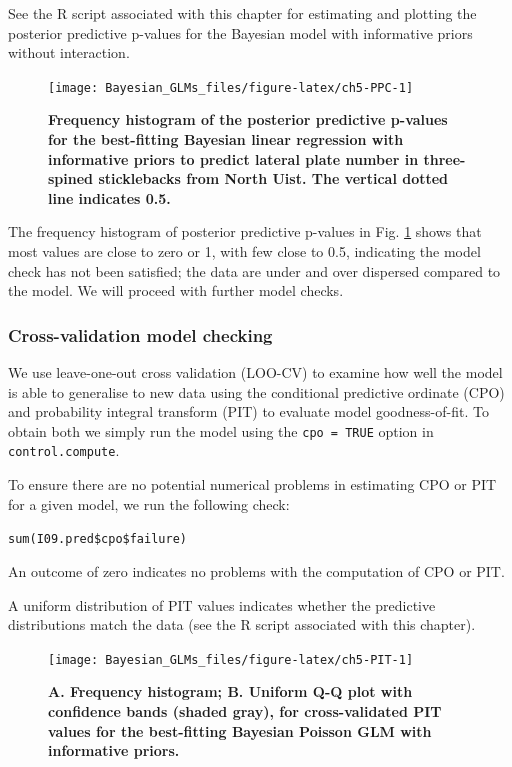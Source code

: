 \documentclass[
]{book}
\begin{document}
See the R script associated with this chapter for estimating and plotting the posterior predictive p-values for the Bayesian model with informative priors without interaction.



\begin{figure}

{\centering \texttt{[image: Bayesian\_GLMs\_files/figure-latex/ch5-PPC-1]} 

}

\caption{\textbf{Frequency histogram of the posterior predictive p-values for the best-fitting Bayesian linear regression with informative priors to predict lateral plate number in three-spined sticklebacks from North Uist. The vertical dotted line indicates 0.5.}}\label{fig:ch5-PPC}
\end{figure}

The frequency histogram of posterior predictive p-values in Fig. \ref{fig:ch5-PPC} shows that most values are close to zero or 1, with few close to 0.5, indicating the model check has not been satisfied; the data are under and over dispersed compared to the model. We will proceed with further model checks.

\hypertarget{pois-cv}{%
\subsubsection{Cross-validation model checking}\label{pois-cv}}

We use leave-one-out cross validation (LOO-CV) to examine how well the model is able to generalise to new data using the conditional predictive ordinate (CPO) and probability integral transform (PIT) to evaluate model goodness-of-fit. To obtain both we simply run the model using the \texttt{cpo\ =\ TRUE} option in \texttt{control.compute}.

To ensure there are no potential numerical problems in estimating CPO or PIT for a given model, we run the following check:

\texttt{sum(I09.pred\$cpo\$failure)}

An outcome of zero indicates no problems with the computation of CPO or PIT.

A uniform distribution of PIT values indicates whether the predictive distributions match the data (see the R script associated with this chapter).



\begin{figure}

{\centering \texttt{[image: Bayesian\_GLMs\_files/figure-latex/ch5-PIT-1]} 

}

\caption{\textbf{A. Frequency histogram; B. Uniform Q-Q plot with confidence bands (shaded gray), for cross-validated PIT values for the best-fitting Bayesian Poisson GLM with informative priors.}}\label{fig:ch5-PIT}
\end{figure}
\end{document}
